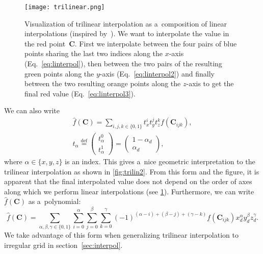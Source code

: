 				\begin{figure}
					\centering
					\texttt{[image: trilinear.png]}
					\caption{Visualization of trilinear interpolation as a~composition of linear interpolations (inspired by~\cite{trilinear1}). We want to interpolate the value in the red point~$\mathbf{C}$. First we interpolate between the four pairs of blue points sharing the last two indices along the $x$\protect\nobreakdash-axis (Eq.~\ref{eq:linterpol}), then between the two pairs of the resulting green points along the $y$\protect\nobreakdash-axis (Eq.~\ref{eq:linterpol2}) and finally between the two resulting orange points along the $z$\protect\nobreakdash-axis to get the final red value (Eq.~\ref{eq:linterpol3}).}
					\label{fig:trilin}
				\end{figure}
					
				\noindent We can also write
					\begin{eqnarray}
						\label{eq:trilingeo}
						\widehat{f}(\mathbf{C}) = \sum_{i,j,k \in \{0,1\}} t_x^i t_y^j t_z^k f(\mathbf{C}_{ijk}),\\
						t_\alpha \stackrel{\text{def}}{=} \begin{pmatrix}t_\alpha^0\\ t_\alpha^1\end{pmatrix} = \begin{pmatrix}1-\alpha_d\\ \alpha_d\end{pmatrix},
					\end{eqnarray}
				where $\alpha \in \{x,y,z\}$ is an index. This gives a~nice geometric interpretation to the trilinear interpolation as shown in \cref{fig:trilin2}. From this form and the figure, it is apparent that the final interpolated value does not depend on the order of axes along which we perform linear interpolations (see \cref{fig:trilin}). Furthermore, we can write $\widehat{f}(\mathbf{C})$ as a~polynomial:
					\begin{equation}
						\label{eq:trilinpoly}
						\widehat{f}(\mathbf{C}) = \sum_{\alpha,\beta,\gamma \in \{0,1\}}\sum^{\alpha}_{i=0}\sum^{\beta}_{j=0}\sum^{\gamma}_{k=0} 	(-1)^{(\alpha-i)+(\beta-j)+(\gamma-k)} f(\mathbf{C}_{ijk}) x_d^\alpha y_d^\beta z_d^\gamma.
					\end{equation}
				We take advantage of this form when generalizing trilinear interpolation to irregular grid in section~\ref{sec:interpol}.
					
